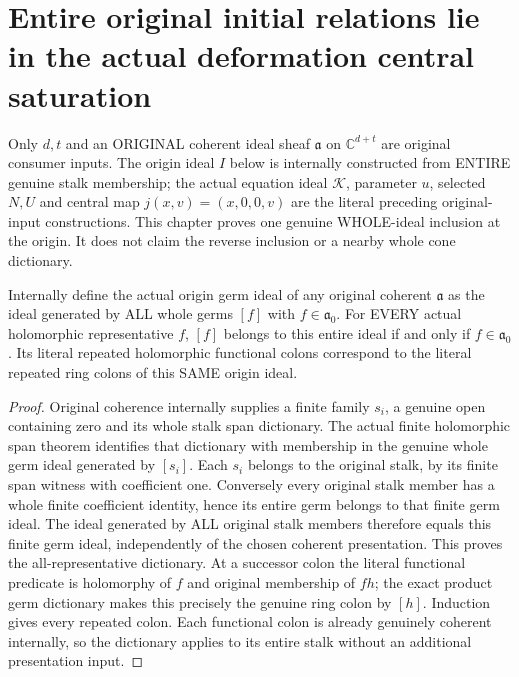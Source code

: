 \section{Entire original initial relations lie in the actual deformation central saturation}
Only $d,t$ and an ORIGINAL coherent ideal sheaf $\mathfrak a$ on
$\mathbb C^{d+t}$ are original consumer inputs. The origin ideal $I$ below
is internally constructed from ENTIRE genuine stalk membership; the actual
equation ideal $\mathcal K$, parameter $u$, selected $N,U$ and central map
$j(x,v)=(x,0,0,v)$ are the literal preceding original-input constructions.
This chapter proves one genuine WHOLE-ideal inclusion at the origin. It
does not claim the reverse inclusion or a nearby whole cone dictionary.

\begin{theorem}
\label{hir:relative-normal-deformation-whole-origin-ideal}
\leanok
{}
Internally define the actual origin germ ideal of any original coherent
$\mathfrak a$ as the ideal generated by ALL whole germs $[f]$ with
$f\in\mathfrak a_0$. For EVERY actual holomorphic representative $f$,
$[f]$ belongs to this entire ideal if and only if $f\in\mathfrak a_0$.
Its literal repeated holomorphic functional colons correspond to the
literal repeated ring colons of this SAME origin ideal.
\end{theorem}
\begin{proof}
Original coherence internally supplies a finite family $s_i$, a genuine
open containing zero and its whole stalk span dictionary. The actual
finite holomorphic span theorem identifies that dictionary with membership
in the genuine whole germ ideal generated by $[s_i]$. Each $s_i$ belongs
to the original stalk, by its finite span witness with coefficient one.
Conversely every original stalk member has a whole finite coefficient
identity, hence its entire germ belongs to that finite germ ideal. The
ideal generated by ALL original stalk members therefore equals this finite
germ ideal, independently of the chosen coherent presentation. This proves
the all-representative dictionary. At a successor colon the literal
functional predicate is holomorphy of $f$ and original membership of $fh$;
the exact product germ dictionary makes this precisely the genuine ring
colon by $[h]$. Induction gives every repeated colon. Each functional colon
is already genuinely coherent internally, so the dictionary applies to its
entire stalk without an additional presentation input.
\end{proof}

